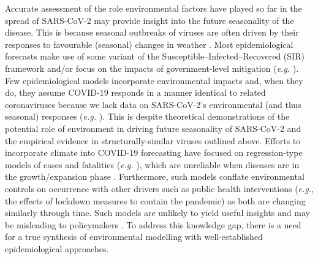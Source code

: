 \documentclass[12pt,english,a4paper]{article}
\newcommand{\virus}{SARS-CoV-2\xspace}
\newcommand{\disease}{COVID-19\xspace}
\begin{document}
Accurate assessment of the role environmental factors have played so far in the spread of \virus may provide insight into the future seasonality of the disease. This is because seasonal outbreaks of viruses are often driven by their responses to favourable (seasonal) changes in weather \cite{NationalResearchCouncil2001}.
Most epidemiological forecasts make use of some variant of the Susceptible--Infected--Recovered (SIR) framework and/or focus on the impacts of government-level mitigation (\emph{e.g.} \citet{Kissler2020, Walker2020}).
Few epidemiological models incorporate environmental impacts and, when they do, they assume \disease responds in a manner identical to related coronaviruses because we lack data on \virus's environmental (and thus seasonal) responses (\emph{e.g.} \citet{Baker2020}).
This is despite theoretical demonstrations of the potential role of environment in driving future seasonality of SARS-CoV-2\cite{Ma2020, Wang2020} and the empirical evidence in structurally-similar viruses outlined above. 
Efforts to incorporate climate into \disease forecasting have focused on regression-type models of cases and fatalities (\emph{e.g.} \citet{Araujo2020}), which are unreliable when diseases are in the growth/expansion phase \cite{Chipperfield2020}. 
Furthermore, such models conflate environmental controls on occurrence with other drivers such as public health interventions (\emph{e.g.}, the effects of lockdown measures to contain the pandemic)\cite{Chipperfield2020} as both are changing similarly through time.
Such models are unlikely to yield useful insights and may be misleading to policymakers \cite{Carlson2020}.
To address this knowledge gap, there is a need for a true synthesis of environmental modelling with well-established epidemiological approaches.
\end{document}
